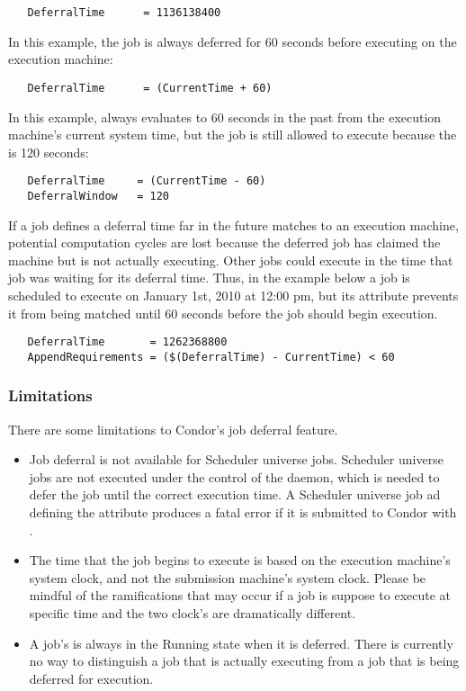 \begin{verbatim} 
   DeferralTime      = 1136138400
\end{verbatim} 

In this example, the job is always deferred for 60 seconds before
executing on the execution machine:

\begin{verbatim} 
   DeferralTime      = (CurrentTime + 60)
\end{verbatim}

In this example,  always evaluates to 60 seconds
in the past from the execution machine's current system time, but the job is still allowed to execute because the  is 120 seconds:

\begin{verbatim} 
   DeferralTime     = (CurrentTime - 60)
   DeferralWindow   = 120
\end{verbatim}

If a job defines a deferral time far in the future matches to an execution machine, potential computation cycles are lost because the deferred job has claimed the machine but is not actually executing. Other jobs could execute in the time that job was waiting for its deferral time. Thus, in the example below a job is scheduled to execute on January 1st, 2010 at 12:00 pm, but its  attribute prevents it from being matched until 60 seconds before the job should begin execution. 

\begin{verbatim}
   DeferralTime       = 1262368800
   AppendRequirements = ($(DeferralTime) - CurrentTime) < 60
\end{verbatim}

\subsubsection{Limitations}
\label{sec:jobdeferral-limitations}
There are some limitations to Condor's job deferral feature.

\begin{itemize}
\item Job deferral is not available for Scheduler universe jobs. Scheduler universe jobs are not executed under the control of the  daemon, which is needed to defer the job until the correct execution time. A Scheduler universe job ad defining the  attribute produces a fatal error if it is submitted to Condor with .

\item The time that the job begins to execute is based on the execution machine's system clock, and not the submission machine's system clock. Please be mindful of the ramifications that may occur if a job is suppose to execute at specific time and the two clock's are dramatically different.

\item A job's  is always in the Running state when it is deferred. There is currently no way to distinguish a job that is actually executing from a job that is being deferred for execution. 
\end{itemize}

